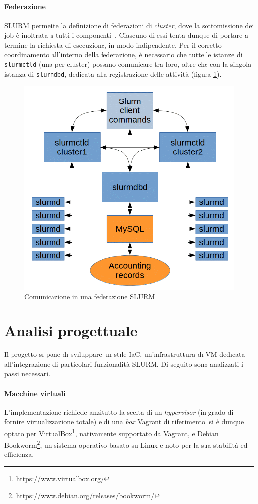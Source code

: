 \documentclass[12pt,a4paper,twoside,openright]{book}
\begin{document}
\subsubsection{Federazione}
\ac{SLURM} permette la definizione di federazioni di \textit{cluster}, dove la sottomissione dei job è inoltrata a tutti i componenti~\cite{slurmfederation}. Ciascuno di essi tenta dunque di portare a termine la richiesta di esecuzione, in modo indipendente. Per il corretto coordinamento all'interno della federazione, è necessario che tutte le istanze di \texttt{slurmctld} (una per cluster) possano comunicare tra loro, oltre che con la singola istanza di \texttt{slurmdbd}, dedicata alla registrazione delle attività (figura \ref{fig:slurm-federation}).
\begin{figure}[ht]
    \centering
    \includegraphics[width=0.55\linewidth]{images/slurm_federation.png}
    \caption{Comunicazione in una federazione \ac{SLURM}~\cite{slurmnetwork}}
    \label{fig:slurm-federation}
\end{figure}


\chapter{Analisi progettuale} %
Il progetto si pone di sviluppare, in stile \acf{IaC}, un'infrastruttura di \ac{VM} dedicata all'integrazione di particolari funzionalità \ac{SLURM}. Di seguito sono analizzati i passi necessari.

\subsubsection{Macchine virtuali}
L'implementazione richiede anzitutto la scelta di un \textit{hypervisor} (in grado di fornire virtualizzazione totale) e di una \textit{box} Vagrant di riferimento; si è dunque optato per VirtualBox\footnote{\url{https://www.virtualbox.org/}}, nativamente supportato da Vagrant, e Debian Bookworm\footnote{\url{https://www.debian.org/releases/bookworm/}}, un sistema operativo basato su Linux e noto per la sua stabilità ed efficienza.
\end{document}
